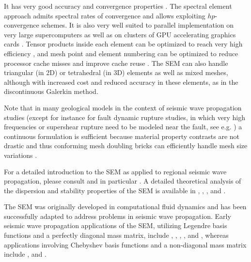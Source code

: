 \documentclass[oneside,english,onecolumn,letterpaper]{book}
\begin{document}
It has very good accuracy and convergence properties \citep{MaPa89,SePr94,DeFiMu02,Coh02,DeSe07,SeOl08,AiWa09,AiWa10,MeStTh12}.
The spectral element approach admits spectral rates of convergence and allows exploiting $hp$-convergence schemes.
It is also very well suited to parallel implementation on very large supercomputers \citep{KoTsChTr03,TsKoChTr03,KoLaMi08a,CaKoLaTiMiLeSnTr08,KoViCh10}
as well as on clusters of GPU accelerating graphics cards \citep{KoMiEr09,KoErGoMi10,Kom11}.
Tensor products inside each element can be optimized to reach very high efficiency \citep{DeFiMu02}, and mesh point and element numbering can be optimized to reduce processor cache misses and improve cache reuse \citep{KoLaMi08a}. The SEM can also handle triangular (in 2D) or tetrahedral (in 3D) elements \citep{WinBoyd96,TaWi00,KoMaTrTaWi01,Coh02,MeViSa06} as well as mixed meshes, although with increased cost and reduced accuracy in these elements, as in the discontinuous Galerkin method.

Note that in many geological models in the context of seismic wave propagation studies
(except for instance for fault dynamic rupture studies, in which very high frequencies or supershear rupture need to be modeled near the fault, see e.g. \cite{BeGlCrViPi07,BeGlCrVi09,PuAmKa09,TaCrEtViBeSa10})
a continuous formulation is sufficient because material property contrasts are not drastic and thus
conforming mesh doubling bricks can efficiently handle mesh size variations \citep{KoTr02a,KoLiTrSuStSh04,LeChLiKoHuTr08,LeChKoHuTr09,LeKoHuTr09}.

For a detailed introduction to the SEM as applied to regional
seismic wave propagation, please consult \citet{PeKoLuMaLeCaLeMaLiBlNiBaTr11,TrKoLi08,KoVi98,KoTr99,ChKoViCaVaFe07} and
in particular \citet{LeKoHuTr09,LeChKoHuTr09,LeChLiKoHuTr08,GoAmTaCaSmSaMaKo09,WiKoScTr04,KoLiTrSuStSh04}.
A detailed theoretical analysis of the dispersion
and stability properties of the SEM is available in \citet{Coh02}, \citet{DeSe07}, \citet{SeOl07}, \citet{SeOl08} and \citet{MeStTh12}.

The SEM was originally developed in computational fluid dynamics \citep{Pat84,MaPa89}
and has been successfully adapted to address problems in seismic wave propagation.
Early seismic wave propagation applications of the SEM, utilizing Legendre basis functions and a
perfectly diagonal mass matrix, include \cite{CoJoTo93}, \cite{Kom97},
\cite{FaMaPaQu97}, \cite{CaGa97}, \cite{KoVi98} and \cite{KoTr99},
whereas applications involving Chebyshev basis functions and a non-diagonal mass matrix
include \cite{SePr94}, \cite{PrCaSe94} and \cite{SePrPr95}.
\end{document}
